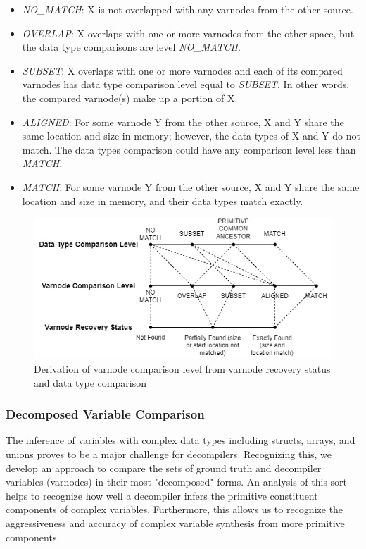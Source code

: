 \begin{itemize}
    \item \emph{NO\_MATCH}: X is not overlapped with any varnodes from the other source.
    \item \emph{OVERLAP}: X overlaps with one or more varnodes from the other space, but the data type comparisons are level \emph{NO\_MATCH}.
    \item \emph{SUBSET}: X overlaps with one or more varnodes and each of its compared varnodes has data type comparison level equal to \emph{SUBSET}. In other words, the compared varnode(s) make up a portion of X.
    \item \emph{ALIGNED}: For some varnode Y from the other source, X and Y share the same location and size in memory; however, the data types of X and Y do not match. The data types comparison could have any comparison level less than \emph{MATCH}.
    \item \emph{MATCH}: For some varnode Y from the other source, X and Y share the same location and size in memory, and their data types match exactly.
\end{itemize}

\begin{figure}
    \centering
    \includegraphics[width=\textwidth]{./figures/varnode-levels.drawio.png}
    \caption{Derivation of varnode comparison level from varnode recovery status and data type comparison}
    \label{fig:varnode-levels}
\end{figure}

\subsubsection{Decomposed Variable Comparison}

The inference of variables with complex data types including structs, arrays, and unions proves to be a major challenge for decompilers. Recognizing this, we develop an approach to compare the sets of ground truth and decompiler variables (varnodes) in their most "decomposed" forms. An analysis of this sort helps to recognize how well a decompiler infers the primitive constituent components of complex variables. Furthermore, this allows us to recognize the aggressiveness and accuracy of complex variable synthesis from more primitive components.

